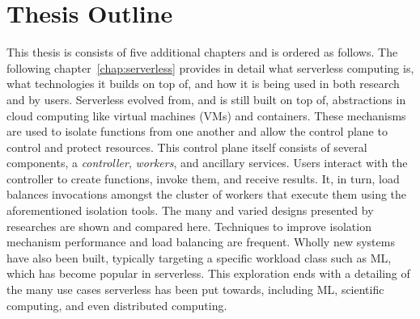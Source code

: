 



\section{Thesis Outline}

This thesis is consists of five additional chapters and is ordered as follows.
The following chapter~\ref{chap:serverless} provides in detail what serverless computing is, what technologies it builds on top of, and how it is being used in both research and by users.
Serverless evolved from, and is still built on top of, abstractions in cloud computing like virtual machines (VMs) and containers.
These mechanisms are used to isolate functions from one another and allow the control plane to control and protect resources.
This control plane itself consists of several components, a \emph{controller}, \emph{workers}, and ancillary services.
Users interact with the controller to create functions, invoke them, and receive results.
It, in turn, load balances invocations amongst the cluster of workers that execute them using the aforementioned isolation tools.
The many and varied designs presented by researches are shown and compared here.
Techniques to improve isolation mechanism performance and load balancing are frequent.
Wholly new systems have also been built, typically targeting a specific workload class such as ML, which has become popular in serverless.
This exploration ends with a detailing of the many use cases serverless has been put towards, including ML, scientific computing, and even distributed computing.

